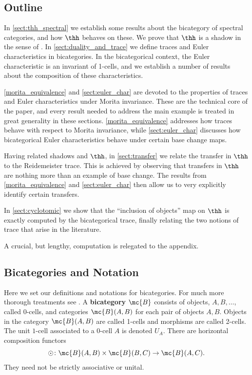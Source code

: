 \documentclass[11pt]{amsart}
\begin{document}
\subsection{Outline}

In \cref{sect:thh_spectral} we establish some results about the bicategory of spectral categories, and how $\thh$ behaves on these. We prove that $\thh$ is a shadow in the sense of \cite{p:thesis}. In \cref{sect:duality_and_trace} we define traces and Euler characteristics in bicategories. In the bicategorical context, the Euler characteristic is an invariant of 1-cells, and we establish a number of results about the composition of these characteristics. 

\cref{morita_equivalence} and \cref{sect:euler_char} are devoted to the properties of traces and Euler characteristics under Morita invariance. These are the technical core of the paper, and every result needed to address the main example is treated in great generality in these sections. \cref{morita_equivalence} addresses how traces behave with respect to Morita invariance, while \cref{sect:euler_char} discusses how bicategorical Euler characteristics behave under certain base change maps. 

Having related shadows and $\thh$, in \cref{sect:transfer} we relate the transfer in $\thh$ to the Reidemeister trace. This is achieved by observing that transfers in $\thh$ are nothing more than an example of base change. The results from \cref{morita_equivalence} and \cref{sect:euler_char} then allow us to very explicitly identify certain transfers.

In \cref{sect:cyclotomic} we show that the ``inclusion of objects'' map on $\thh$ is exactly computed by the bicategorical trace, finally relating the two notions of trace that arise in the literature. 

A crucial, but lengthy, computation is relegated to the appendix. 


\subsection{Bicategories and Notation}

Here we set our definitions and notations for bicategories. For much more thorough treatments see \cite{benabou,leinster}. 
A {\bf bicategory} $\mc{B}$ consists of objects, $A, B, \ldots$, called $0$-cells,  and categories $\mc{B}(A, B)$ for each pair of objects $A, B$. Objects in the category $\mc{B}(A, B)$ are called 1-cells and morphisms are called 2-cells.  The unit $1$-cell associated to a 0-cell $A$ is denoted $U_A$.
There are horizontal composition functors
\[
\odot \colon  \mc{B}(A, B) \times \mc{B}(B, C) \to \mc{B}(A, C). 
\]
They need not be strictly associative or unital. 
\end{document}
